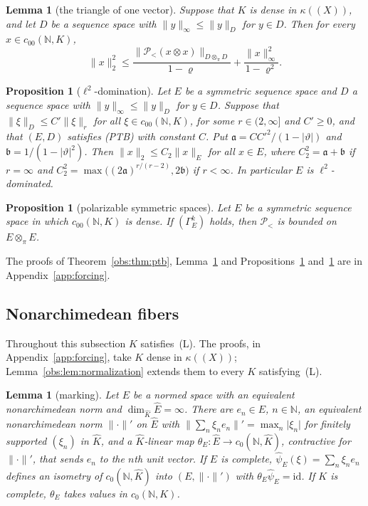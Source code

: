 \documentclass[11pt]{amsart}
\newtheorem{lemma}[theorem]{Lemma}
\newtheorem{proposition}[theorem]{Proposition}
\theoremstyle{definition}
\theoremstyle{remark}
\numberwithin{equation}{section}
\newcommand{\N}{\mathbb N}
\newcommand{\id}{\mathrm{id}}
\newcommand{\abs}[1]{\lvert #1\rvert}
\newcommand{\norm}[1]{\lVert #1\rVert}
\newcommand{\Kh}{\widehat K}
\theoremstyle{plain}
\theoremstyle{definition}
\theoremstyle{plain}
\newcommand{\cP}{\mathcal P}
\begin{document}
\begin{lemma}[the triangle of one vector]\label{obs:lem:single-vector}
Suppose that $K$ is dense in $\kappa((X))$, and let $D$ be a sequence space with $\norm y_\infty\le\norm y_D$ for
$y\in D$. Then for every $x\in c_{00}(\N,K)$,
\[
 \norm x_2^2\le\frac{\norm{\cP_<(x\otimes x)}_{D\otimes_\pi D}}{1-\varrho}+\frac{\norm x_\infty^2}{1-\varrho^2}.
\]
\end{lemma}

\begin{proposition}[$\ell^2$-domination]\label{obs:prop:l2-domination}
Let $E$ be a symmetric sequence space and $D$ a sequence space with $\norm y_\infty\le\norm y_D$ for $y\in D$. Suppose
that $\norm\xi_D\le C'\norm\xi_r$ for all $\xi\in c_{00}(\N,K)$, for some $r\in(2,\infty]$ and $C'\ge0$, and that $(E,D)$
satisfies \textup{(PTB)} with constant $C$. Put $\mathfrak a=CC'^2/(1-\abs\vartheta)$ and
$\mathfrak b=1/(1-\abs\vartheta^2)$. Then $\norm x_2\le C_2\norm x_E$ for all $x\in E$, where $C_2^2=\mathfrak a+\mathfrak b$
if $r=\infty$ and $C_2^2=\max\bigl((2\mathfrak a)^{r/(r-2)},2\mathfrak b\bigr)$ if $r<\infty$. In particular $E$ is
$\ell^2$\nobreakdash-dominated.
\end{proposition}

\begin{proposition}[polarizable symmetric spaces]\label{obs:prop:gamma-ptb}
Let $E$ be a symmetric sequence space in which $c_{00}(\N,K)$ is dense. If $(\Gamma^k_E)$ holds, then $\cP_<$ is bounded
on $E\otimes_\pi E$.
\end{proposition}

The proofs of Theorem~\ref{obs:thm:ptb}, Lemma~\ref{obs:lem:single-vector} and Propositions~\ref{obs:prop:l2-domination}
and~\ref{obs:prop:gamma-ptb} are in Appendix~\ref{app:forcing}.

\subsection{Nonarchimedean fibers}\label{obs:ssec:nonarch}
Throughout this subsection $K$ satisfies~\textup{(L)}. The proofs, in Appendix~\ref{app:forcing}, take $K$ dense in
$\kappa((X))$; Lemma~\ref{obs:lem:normalization} extends them to every $K$ satisfying~\textup{(L)}.

\begin{lemma}[marking]\label{fib:lem:marking}
Let $E$ be a normed space with an equivalent nonarchimedean norm and $\dim_{\Kh}\widehat E=\infty$. There are
$e_n\in E$, $n\in\N$, an equivalent nonarchimedean norm $\norm\cdot'$ on $\widehat E$ with
$\norm{\sum_n\xi_ne_n}'=\max_n\abs{\xi_n}$ for finitely supported $(\xi_n)$ in $\Kh$, and a $\Kh$\nobreakdash-linear map
$\theta_E\colon\widehat E\to c_0(\N,\Kh)$, contractive for $\norm\cdot'$, that sends $e_n$ to the $n$th unit vector. If
$E$ is complete, $\widehat\psi_E(\xi)=\sum_n\xi_ne_n$ defines an isometry of $c_0(\N,\Kh)$ into $(E,\norm\cdot')$ with
$\theta_E\widehat\psi_E=\id$. If $K$ is complete, $\theta_E$ takes values in $c_0(\N,K)$.
\end{lemma}
\end{document}
